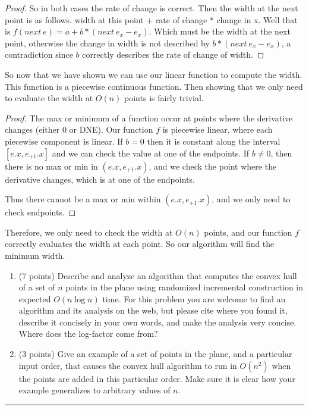\documentclass[11pt]{article}
\begin{document}
\begin{proof}
    So in both cases the rate of change is correct. Then the width at the next point is as follows.
    width at this point + rate of change * change in x. Well that is $f(next \: e) = a + b * (next \: e_x - e_x)$.
    Which must be the width at the next point, otherwise the change in width is not described by $b * (next \: e_x - e_x)$,
    a contradiction since $b$ correctly describes the rate of change of width.
\end{proof}

So now that we have shown we can use our linear function to compute the width. 
This function is a piecewise continuous function. 
Then showing that we only need to evaluate the width at $O(n)$ points is fairly trivial.

\begin{proof}
    
    The max or minimum of a function occur at points where the derivative changes (either 0 or DNE).
    Our function $f$ is piecewise linear, where each piecewise component is linear.
    If $b = 0$ then it is constant along the interval $[e.x, e_{+1}.x]$ and we can check the value at one of the endpoints.
    If $b \neq 0$, then there is no max or min in $(e.x, e_{+1}.x)$, and we check the point where the derivative changes,
    which is at one of the endpoints.

    Thus there cannot be a max or min within $(e.x, e_{+1}.x)$, and we only need to check endpoints. 
\end{proof}

Therefore, we only need to check the width at $O(n)$ points, and our function $f$ correctly evaluates the width 
at each point. So our algorithm will find the minimum width. 



\begin{enumerate}

    \item (7 points) Describe and analyze an algorithm that computes the
        convex hull of a set of $n$ points in the plane using randomized
        incremental construction in expected $O(n \log n)$ time. For this
        problem you are welcome to find an algorithm and its analysis on the
        web, but please cite where you found it, describe it concisely in
        your own words, and make the analysis very concise. Where does the
        log-factor come from?

    \item (3 points) Give an example of a set of points in the plane, and a
        particular input order, that causes the convex hull algorithm to run in
        $O(n^2)$ when the points are added in this particular order. Make sure it
        is clear how your example generalizes to arbitrary values of $n$.

\end{enumerate}
\hrule
\end{document}
